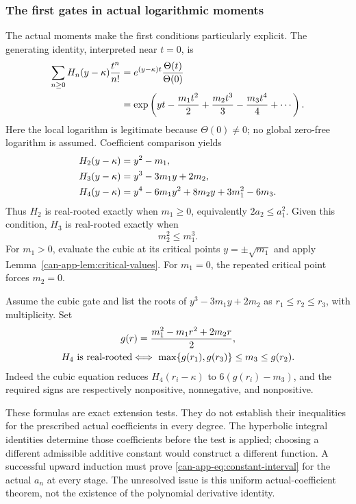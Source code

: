 \documentclass[11pt,a4paper]{article}
\numberwithin{equation}{section}
\theoremstyle{definition}
\theoremstyle{remark}
\begin{document}
\subsubsection{The first gates in actual logarithmic moments}

The actual moments make the first conditions particularly explicit.
The generating identity, interpreted near $t=0$, is
\begin{align}
 \sum_{n\geq0}H_n(y-\kappa)\frac{t^n}{n!}
 &=e^{(y-\kappa)t}\frac{\Theta(t)}{\Theta(0)}\notag\\
 &=\exp\left(yt-\frac{m_1t^2}{2}
           +\frac{m_2t^3}{3}-\frac{m_3t^4}{4}+\cdots\right).
 \label{can-app-eq:centered-generating}
\end{align}
Here the local logarithm is legitimate because $\Theta(0)\ne0$;
no global zero-free logarithm is assumed. Coefficient comparison yields
\begin{align}
 H_2(y-\kappa)&=y^2-m_1,\notag\\
 H_3(y-\kappa)&=y^3-3m_1y+2m_2,\notag\\
 H_4(y-\kappa)&=y^4-6m_1y^2+8m_2y+3m_1^2-6m_3.
 \label{can-app-eq:centered-first}
\end{align}
Thus $H_2$ is real-rooted exactly when $m_1\geq0$, equivalently
$2a_2\leq a_1^2$. Given this condition, $H_3$ is real-rooted exactly when
\begin{equation}\label{can-app-eq:cubic-gate}
 m_2^2\leq m_1^3.
\end{equation}
For $m_1>0$, evaluate the cubic at its critical points
$y=\pm\sqrt{m_1}$ and apply Lemma~\ref{can-app-lem:critical-values}.
For $m_1=0$, the repeated critical point forces $m_2=0$.

Assume the cubic gate and list the roots of
$y^3-3m_1y+2m_2$ as $r_1\leq r_2\leq r_3$, with multiplicity.
Set
\begin{gather}
 g(r)=\frac{m_1^2-m_1r^2+2m_2r}{2},\notag\\
 H_4\text{ is real-rooted} \Longleftrightarrow\
 \max\{g(r_1),g(r_3)\}\leq m_3\leq g(r_2).
 \label{can-app-eq:quartic-gate}
\end{gather}
Indeed the cubic equation reduces $H_4(r_i-\kappa)$ to
$6(g(r_i)-m_3)$, and the required signs are respectively
nonpositive, nonnegative, and nonpositive.

These formulas are exact extension tests. They do not establish their
inequalities for the prescribed actual coefficients in every degree.
The hyperbolic integral identities determine those coefficients before
the test is applied; choosing a different admissible additive constant
would construct a different function. A successful upward induction must
prove \eqref{can-app-eq:constant-interval} for the actual $a_n$ at every
stage. The unresolved issue is this uniform actual-coefficient theorem,
not the existence of the polynomial derivative identity.
\end{document}
